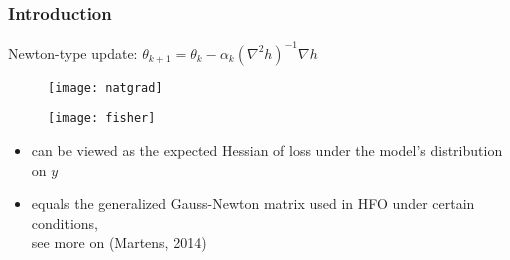 \begin{frame}
\frametitle{Introduction}
Newton-type update: $\theta_{k+1} = \theta_k - \alpha_k (\nabla^2 h)^{-1} \nabla h$
\begin{figure}
    \raggedright
    \texttt{[image: natgrad]}
\end{figure}

\begin{figure}
    \raggedright
    \texttt{[image: fisher]}
\end{figure}

{\footnotesize
\begin{itemize}
    \item can be viewed as the expected Hessian of loss under the model's distribution on $y$
    \item equals the generalized Gauss-Newton matrix used in HFO under certain conditions, \\
        see more on (Martens, 2014)
\end{itemize}
}

\end{frame}
